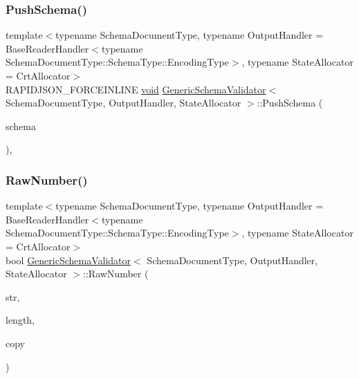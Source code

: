 \mbox{\label{classGenericSchemaValidator_ae7302da6df72e7af0451a78998eb624d}} 
\subsubsection{\texorpdfstring{Push\+Schema()}{PushSchema()}}
{\footnotesize\ttfamily template$<$typename Schema\+Document\+Type, typename Output\+Handler = Base\+Reader\+Handler$<$typename Schema\+Document\+Type\+::\+Schema\+Type\+::\+Encoding\+Type$>$, typename State\+Allocator = Crt\+Allocator$>$ \\
R\+A\+P\+I\+D\+J\+S\+O\+N\+\_\+\+F\+O\+R\+C\+E\+I\+N\+L\+I\+NE \hyperlink{imgui__impl__opengl3__loader_8h_ac668e7cffd9e2e9cfee428b9b2f34fa7}{void} \hyperlink{classGenericSchemaValidator}{Generic\+Schema\+Validator}$<$ Schema\+Document\+Type, Output\+Handler, State\+Allocator $>$\+::Push\+Schema (\begin{DoxyParamCaption}\item[{const \hyperlink{classGenericSchemaValidator_ac79628f00f6720bbabb70b44f0d076a0}{Schema\+Type} \&}]{schema }\end{DoxyParamCaption})\hspace{0.3cm}{\ttfamily [inline]}, {\ttfamily [private]}}

\mbox{\label{classGenericSchemaValidator_ae4f024145421d2c1dde08a9de528722a}} 
\subsubsection{\texorpdfstring{Raw\+Number()}{RawNumber()}}
{\footnotesize\ttfamily template$<$typename Schema\+Document\+Type, typename Output\+Handler = Base\+Reader\+Handler$<$typename Schema\+Document\+Type\+::\+Schema\+Type\+::\+Encoding\+Type$>$, typename State\+Allocator = Crt\+Allocator$>$ \\
bool \hyperlink{classGenericSchemaValidator}{Generic\+Schema\+Validator}$<$ Schema\+Document\+Type, Output\+Handler, State\+Allocator $>$\+::Raw\+Number (\begin{DoxyParamCaption}\item[{const \hyperlink{classGenericSchemaValidator_a8b7dab5a0cda9cc0adaefb4401d260c1}{Ch} $\ast$}]{str,  }\item[{\hyperlink{rapidjson_8h_a5ed6e6e67250fadbd041127e6386dcb5}{Size\+Type}}]{length,  }\item[{bool}]{copy }\end{DoxyParamCaption})\hspace{0.3cm}{\ttfamily [inline]}}

